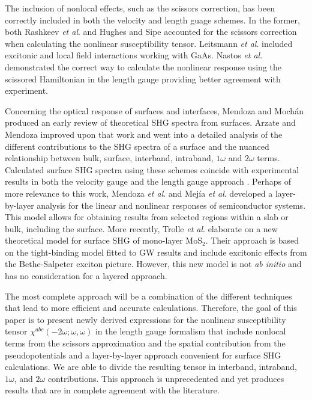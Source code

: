 The inclusion of nonlocal effects, such as the scissors correction, has been
correctly included in both the velocity and length guage schemes. 
In the former, both 
Rashkeev \emph{et al}.\cite{rashkeevPRB98} and 
Hughes and Sipe\cite{hughesPRB96} 
accounted for the scissors correction when calculating the nonlinear 
susceptibility tensor.
Leitsmann \emph{et al}.\cite{leitsmannPRB05} 
included excitonic and local field interactions working with GaAs.
Nastos \emph{et al}.\cite{nastosPRB05} demonstrated the correct 
way to calculate the nonlinear response using the scissored Hamiltonian 
in the length gauge providing better agreement with experiment. 

Concerning the optical response of surfaces and interfaces,
Mendoza and Moch\'an\cite{mendozaPRB96} produced an early review of 
theoretical SHG spectra from surfaces. 
Arzate and Mendoza\cite{arzatePRB01} improved upon that work and
went into a detailed analysis of the different contributions to the 
SHG spectra of a surface and the nuanced relationship between bulk, 
surface, interband, intraband, $1\omega$ and $2\omega$ terms. 
Calculated surface SHG spectra using these schemes coincide with experimental
results in both the velocity gauge
\cite{mendozaPRB01,mendozaPRL98,reiningPRB94} and the length gauge approach
\cite{sharmaPRB03}. 
Perhaps of more relevance to this work, 
Mendoza \emph{et al}.\cite{mendozaPRB06} and 
Mej\'ia \emph{et al}.\cite{mejiaRMF04} developed a layer-by-layer analysis for 
the linear and nonlinear responses of semiconductor systems. This model
allows for obtaining results from selected regions within a slab or bulk,
including the surface.
More recently, 
Trolle \emph{et al}.\cite{trollePRB14} 
elaborate on a new theoretical model for surface SHG of 
mono-layer MoS$_{2}$. Their approach is based on the tight-binding model 
fitted to GW results and include excitonic effects from the 
Bethe-Salpeter exciton picture. However, this new model is not 
\emph{ab initio} and has no consideration for a layered approach.

The most complete approach will be a combination of the different techniques 
that lead to more efficient and accurate calculations. Therefore,
the goal of this paper is to present newly derived expressions for the 
nonlinear susceptibility tensor $\chi^{abc}(-2\omega;\omega,\omega)$ 
in the length gauge formalism
that include nonlocal terms from the scissors approximation 
and the spatial contribution from the pseudopotentials and a 
layer-by-layer approach convenient for surface SHG calculations. We are
able to divide the resulting tensor in interband, intraband, $1\omega$, and 
$2\omega$ contributions. This approach is unprecedented and yet produces 
results that are in complete agreement with the literature.

